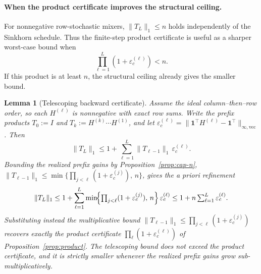 \documentclass[10pt]{article}
\numberwithin{equation}{section}
\theoremstyle{plain}
\newtheorem{lemma}[theorem]{Lemma}
\theoremstyle{definition}
\theoremstyle{remark}
\newcommand{\ones}{\mathbf{1}}
\begin{document}
\paragraph{When the product certificate improves the structural ceiling.}
For nonnegative row-stochastic mixers, \(\|T_L\|_1\le n\) holds independently of
the Sinkhorn schedule. Thus the finite-step product certificate is useful as
a sharper worst-case bound when
\[
        \prod_{\ell=1}^L(1+\varepsilon_c^{(\ell)})<n.
\]
If this product is at least \(n\), the structural ceiling already gives the smaller
bound.

\begin{lemma}[Telescoping backward certificate]\label{lem:telescoping}
Assume the ideal column--then--row order, so each $H^{(\ell)}$ is nonnegative with
exact row sums. Write the prefix products $T_0:=I$ and $T_k:=H^{(k)}\cdots H^{(1)}$, and let
$\varepsilon_c^{(\ell)}=\|\ones^\top H^{(\ell)}-\ones^\top\|_{\infty,\mathrm{vec}}$. Then
\begin{equation}\label{eq:telescoping}
\|T_L\|_1
\le
1+\sum_{\ell=1}^L \|T_{\ell-1}\|_1\,\varepsilon_c^{(\ell)} .
\end{equation}
Bounding the realized prefix gains by Proposition~\ref{prop:cap-n},
$\|T_{\ell-1}\|_1\le\min\{\prod_{j<\ell}(1+\varepsilon_c^{(j)}),\,n\}$, gives the a priori
refinement
\begin{equation}\label{eq:telescoping-apriori}
\|T_L\|_1
\le
1+\sum_{\ell=1}^L \min\!\Bigl\{\textstyle\prod_{j<\ell}(1+\varepsilon_c^{(j)}),\,n\Bigr\}\,
\varepsilon_c^{(\ell)}
\le
1+n\sum_{\ell=1}^L\varepsilon_c^{(\ell)} .
\end{equation}
Substituting instead the multiplicative bound
$\|T_{\ell-1}\|_1\le\prod_{j<\ell}(1+\varepsilon_c^{(j)})$ recovers exactly the product
certificate $\prod_\ell(1+\varepsilon_c^{(\ell)})$ of Proposition~\ref{prop:product}. The
telescoping bound does not exceed the product certificate, and it is
strictly smaller whenever the realized prefix gains grow sub-multiplicatively.
\end{lemma}
\end{document}
